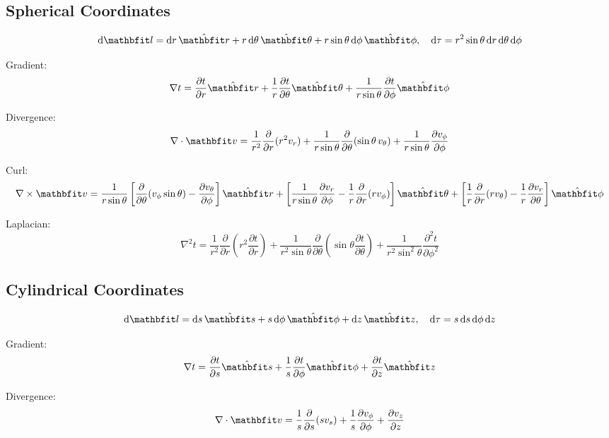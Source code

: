 \documentclass[a4paper,oneside,article]{memoir}
\begin{document}
\subsection*{Spherical Coordinates}

\[
\mathrm{d}\v{l} = \mathrm{d}r\,\hat{\v{r}} + r\,\mathrm{d}\theta\,\hat{\v{\theta}} + r \sin \theta\,\mathrm{d}\phi\,\hat{\v{\phi}}, \quad
\mathrm{d}\tau = r^2 \sin \theta\, \mathrm{d}r\,\mathrm{d}\theta\,\mathrm{d}\phi
\]

Gradient:
\[
\nabla t = \frac{\partial t}{\partial r} \hat{\v{r}} +
\frac{1}{r} \frac{\partial t}{\partial \theta} \hat{\v{\theta}} +
\frac{1}{r \sin \theta} \frac{\partial t}{\partial \phi} \hat{\v{\phi}}
\]

Divergence:
\[
\nabla \cdot \v{v} =
\frac{1}{r^2} \frac{\partial}{\partial r} (r^2 v_r) +
\frac{1}{r \sin \theta} \frac{\partial}{\partial \theta} (\sin \theta\, v_\theta) +
\frac{1}{r \sin \theta} \frac{\partial v_\phi}{\partial \phi}
\]

Curl:
\[
\nabla \times \v{v} =
\frac{1}{r \sin \theta} \left[
\frac{\partial}{\partial \theta} (v_\phi \sin \theta) -
\frac{\partial v_\theta}{\partial \phi}
\right] \hat{\v{r}} +
\left[
\frac{1}{r \sin \theta} \frac{\partial v_r}{\partial \phi} -
\frac{1}{r} \frac{\partial}{\partial r} (r v_\phi)
\right] \hat{\v{\theta}} +
\left[
\frac{1}{r} \frac{\partial}{\partial r} (r v_\theta) -
\frac{1}{r} \frac{\partial v_r}{\partial \theta}
\right] \hat{\v{\phi}}
\]

Laplacian:
\[
\nabla^2 t =
\frac{1}{r^2} \frac{\partial}{\partial r} \left( r^2 \frac{\partial t}{\partial r} \right) +
\frac{1}{r^2 \sin \theta} \frac{\partial}{\partial \theta} \left( \sin \theta \frac{\partial t}{\partial \theta} \right) +
\frac{1}{r^2 \sin^2 \theta} \frac{\partial^2 t}{\partial \phi^2}
\]

\subsection*{Cylindrical Coordinates}

\[
\mathrm{d}\v{l} = \mathrm{d}s\,\hat{\v{s}} + s\,\mathrm{d}\phi\,\hat{\v{\phi}} + \mathrm{d}z\,\hat{\v{z}}, \quad
\mathrm{d}\tau = s\,\mathrm{d}s\,\mathrm{d}\phi\,\mathrm{d}z
\]

Gradient:
\[
\nabla t = \frac{\partial t}{\partial s} \hat{\v{s}} +
\frac{1}{s} \frac{\partial t}{\partial \phi} \hat{\v{\phi}} +
\frac{\partial t}{\partial z} \hat{\v{z}}
\]

Divergence:
\[
\nabla \cdot \v{v} =
\frac{1}{s} \frac{\partial}{\partial s} (s v_s) +
\frac{1}{s} \frac{\partial v_\phi}{\partial \phi} +
\frac{\partial v_z}{\partial z}
\]
\end{document}
